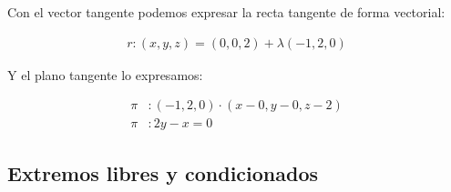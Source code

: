 Con el vector tangente podemos expresar la recta tangente de forma vectorial:

\begin{align*}
    r: (x, y, z) = (0, 0, 2) + \lambda(-1, 2, 0)
\end{align*}

Y el plano tangente lo expresamos:

\begin{align*}
    \pi&: (-1, 2, 0) \cdot (x - 0, y - 0, z - 2) \\
    \pi&: \boxed{2y - x = 0}
\end{align*}

\subsection{Extremos libres y condicionados}


